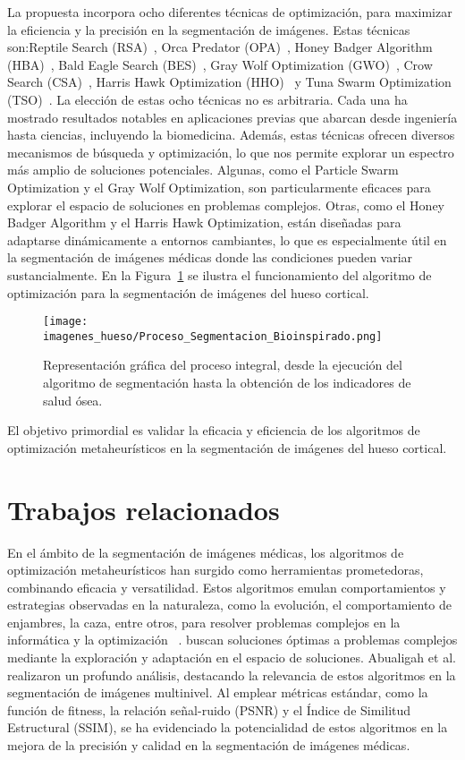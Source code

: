 \documentclass[conference]{IEEEtran}
\begin{document}
\noindent La propuesta incorpora ocho diferentes técnicas de optimización, para maximizar la eficiencia y la precisión en la segmentación de imágenes. Estas técnicas son:Reptile Search (RSA)~\cite{Abualigah2022}, Orca Predator (OPA)~\cite{Jiang2022}, Honey Badger Algorithm (HBA)~\cite{Hashim2022}, Bald Eagle Search (BES)~\cite{Alsattar2019}, Gray Wolf Optimization (GWO)~\cite{Mirjalili2014}, Crow Search (CSA)~\cite{Askarzadeh2016}, Harris Hawk Optimization (HHO)~\cite{Heidari2019}  y Tuna Swarm Optimization (TSO)~\cite{Xie2021}. La elección de estas ocho técnicas no es arbitraria. Cada una ha mostrado resultados notables en aplicaciones previas que abarcan desde ingeniería hasta ciencias, incluyendo la biomedicina. Además, estas técnicas ofrecen diversos mecanismos de búsqueda y optimización, lo que nos permite explorar un espectro más amplio de soluciones potenciales. Algunas, como el Particle Swarm Optimization y el Gray Wolf Optimization, son particularmente eficaces para explorar el espacio de soluciones en problemas complejos. Otras, como el Honey Badger Algorithm y el Harris Hawk Optimization, están diseñadas para adaptarse dinámicamente a entornos cambiantes, lo que es especialmente útil en la segmentación de imágenes médicas donde las condiciones pueden variar sustancialmente. En la Figura~\ref{fig:z} se ilustra el funcionamiento del algoritmo de optimización para la segmentación de imágenes del hueso cortical.

\begin{figure}[ht]
    \centering
    \texttt{[image: imagenes\_hueso/Proceso\_Segmentacion\_Bioinspirado.png]}
    \caption{Representación gráfica del proceso integral, desde la ejecución del algoritmo de segmentación hasta la obtención de los indicadores de salud ósea.}
    \label{fig:z}
\end{figure}

El objetivo primordial es validar la eficacia y eficiencia de los algoritmos de optimización metaheurísticos en la segmentación de imágenes del hueso cortical.
\section{Trabajos relacionados} \label{sec:rw}

\noindent En el ámbito de la segmentación de imágenes médicas, los algoritmos de optimización metaheurísticos han surgido como herramientas prometedoras, combinando eficacia y versatilidad. Estos algoritmos emulan comportamientos y estrategias observadas en la naturaleza, como la evolución, el comportamiento de enjambres, la caza, entre otros, para resolver problemas complejos en la informática y la optimización ~\cite{Darwish2018}. buscan soluciones óptimas a problemas complejos mediante la exploración y adaptación en el espacio de soluciones. Abualigah et al.\cite{Abualigah2023} realizaron un profundo análisis, destacando la relevancia de estos algoritmos en la segmentación de imágenes multinivel. Al emplear métricas estándar, como la función de fitness, la relación señal-ruido (PSNR) y el Índice de Similitud Estructural (SSIM), se ha evidenciado la potencialidad de estos algoritmos en la mejora de la precisión y calidad en la segmentación de imágenes médicas\cite{Ma2023}.
\end{document}
